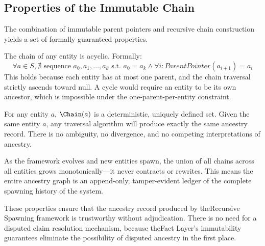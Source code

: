 \subsection{Properties of the Immutable Chain}

The combination of immutable parent pointers and recursive chain construction yields a set of formally guaranteed properties.

\begin{property}[No Cycles]
The chain of any entity is acyclic. Formally:
\[
\forall a \in S, \nexists \text{ sequence } a_0, a_1, \ldots, a_k \text{ s.t. } a_0 = a_k \land \forall i : ParentPointer(a_{i+1}) = a_i
\]
This holds because each entity has at most one parent, and the chain traversal strictly ascends toward null. A cycle would require an entity to be its own ancestor, which is impossible under the one-parent-per-entity constraint.
\end{property}

\begin{property}
For any entity $a$, $\Chain(a)$ is a deterministic, uniquely defined set. Given the same entity $a$, any traversal algorithm will produce exactly the same ancestry record. There is no ambiguity, no divergence, and no competing interpretations of ancestry.
\end{property}

\begin{property}
As the framework evolves and new entities spawn, the union of all chains across all entities grows monotonically—it never contracts or rewrites. This means the entire ancestry graph is an append-only, tamper-evident ledger of the complete spawning history of the system.
\end{property}

These properties ensure that the ancestry record produced by theRecursive Spawning framework is trustworthy without adjudication. There is no need for a disputed claim resolution mechanism, because theFact Layer's immutability guarantees eliminate the possibility of disputed ancestry in the first place.

